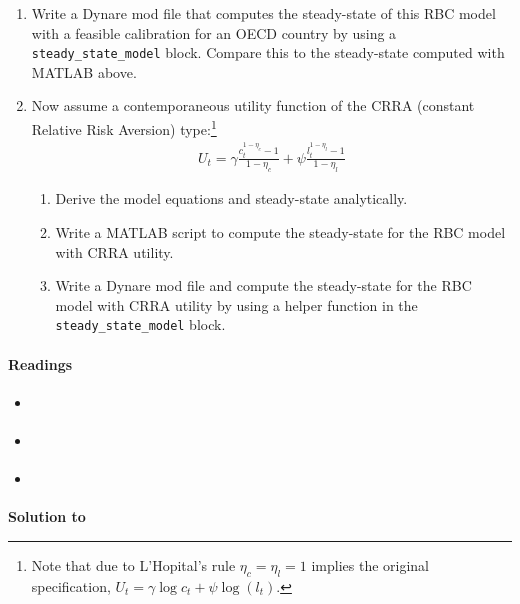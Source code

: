 \begin{enumerate}
\item
Write a Dynare mod file that computes the steady-state of this RBC model
  with a feasible calibration for an OECD country by using a \texttt{steady\_state\_model} block.
Compare this to the steady-state computed with MATLAB above.

\item
Now assume a contemporaneous utility function of the CRRA (constant Relative Risk Aversion) type:\footnote{%
  Note that due to L'Hopital's rule \(\eta_c=\eta_l=1\) implies the original specification,
  \(U_t=\gamma \log c_t + \psi \log(l_t)\).
}
\begin{align*}
  U_t = \gamma \frac{c_{t}^{1-\eta_c}-1}{1-\eta_c} + \psi \frac{l_{t}^{1-\eta_l}-1}{1-\eta_l}
\end{align*}

\begin{enumerate}
  \item
  Derive the model equations and steady-state analytically.
  \item
  Write a MATLAB script to compute the steady-state for the RBC model with CRRA utility.
  \item
  Write a Dynare mod file and compute the steady-state for the RBC model with CRRA utility
    by using a helper function in the \texttt{steady\_state\_model} block.
  \end{enumerate}

\end{enumerate}

\paragraph{Readings}
\begin{itemize}
\item \textcite{King.Rebelo_1999_ResuscitatingRealBusiness}
\item \textcite[Ch.~5]{Romer_2019_AdvancedMacroeconomics}
\item \textcite[Ch.~1, Ch.~2]{Torres_2013_IntroductionDynamicMacroeconomic}
\end{itemize}

\begin{solution}\textbf{Solution to }
\ifDisplaySolutions%

\fi
\newpage
\end{solution}